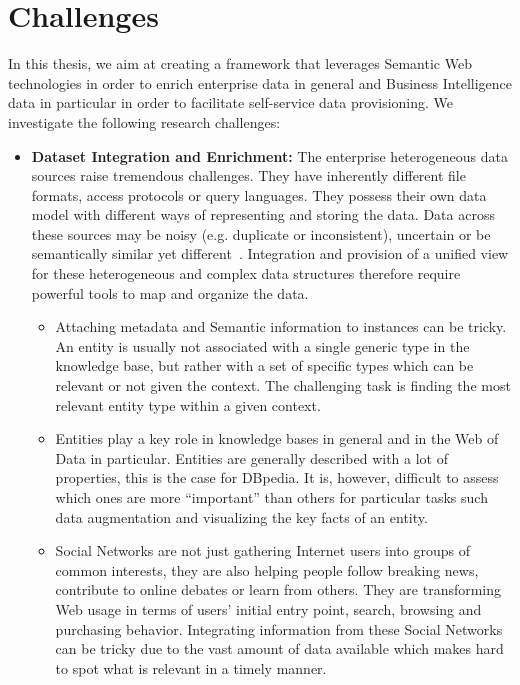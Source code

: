 \documentclass[onecolumn, crcready]{../../Util/LaTEX/iosart2c}
\begin{document}
\section{Challenges}
\label{sec:challenges}

In this thesis, we aim at creating a framework that leverages Semantic Web technologies in order to enrich enterprise data in general and Business Intelligence data in particular in order to facilitate self-service data provisioning. We investigate the following research challenges:

\begin{itemize}
\item {\bf Dataset Integration and Enrichment:} The enterprise heterogeneous data sources raise tremendous challenges. They have inherently different file formats, access protocols or query languages. They possess their own data model with different ways of representing and storing the data. Data across these sources may be noisy (e.g. duplicate or inconsistent), uncertain or be semantically similar yet different~\cite{Avitha:EuroJorunal:11}. Integration and provision of a unified view for these heterogeneous and complex data structures therefore require powerful tools to map and organize the data.
\begin{itemize}
	\item Attaching metadata and Semantic information to instances can be tricky. An entity is usually not associated with a single generic type in the knowledge base, but rather with a set of specific types which can be relevant or not given the context. The challenging task is finding the most relevant entity type within a given context.
	\item Entities play a key role in knowledge bases in general and in the Web of Data in particular. Entities are generally described with a lot of properties, this is the case for DBpedia. It is, however, difficult to assess which ones are more ``important'' than others for particular tasks such data augmentation and visualizing the key facts of an entity.
	\item Social Networks are not just gathering Internet users into groups of common interests, they are also helping people follow breaking news, contribute to online debates or learn from others. They are transforming Web usage in terms of users' initial entry point, search, browsing and purchasing behavior. Integrating information from these Social Networks can be tricky due to the vast amount of data available which makes hard to spot what is relevant in a timely manner.

\end{itemize}
\end{itemize}
\end{document}
